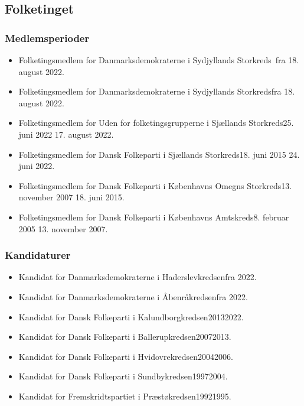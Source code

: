 \documentclass[11pt, a4paper]{awesome-cv}
\begin{document}
\begin{cvletter}
\subsection*{Folketinget}
\subsubsection*{Medlemsperioder}
\begin{itemize}
\item Folketingsmedlem for Danmarksdemokraterne i Sydjyllands Storkreds fra 18. august 2022.
\item Folketingsmedlem for Danmarksdemokraterne i Sydjyllands Storkredsfra 18. august 2022.
\item Folketingsmedlem for Uden for folketingsgrupperne i Sjællands Storkreds25. juni 2022  17. august 2022.
\item Folketingsmedlem for Dansk Folkeparti i Sjællands Storkreds18. juni 2015  24. juni 2022.
\item Folketingsmedlem for Dansk Folkeparti i Københavns Omegns Storkreds13. november 2007  18. juni 2015.
\item Folketingsmedlem for Dansk Folkeparti i Københavns Amtskreds8. februar 2005  13. november 2007.
\end{itemize}
\subsubsection*{Kandidaturer}
\begin{itemize}
\item Kandidat for Danmarksdemokraterne i Haderslevkredsenfra 2022.
\item Kandidat for Danmarksdemokraterne i Åbenråkredsenfra 2022.
\item Kandidat for Dansk Folkeparti i Kalundborgkredsen20132022.
\item Kandidat for Dansk Folkeparti i Ballerupkredsen20072013.
\item Kandidat for Dansk Folkeparti i Hvidovrekredsen20042006.
\item Kandidat for Dansk Folkeparti i Sundbykredsen19972004.
\item Kandidat for Fremskridtspartiet i Præstøkredsen19921995.
\end{itemize}

\end{cvletter}
\end{document}
